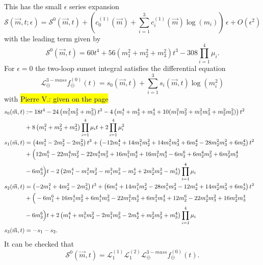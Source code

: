 \documentclass[a4paper,12pt]{article}
\numberwithin{equation}{section}
\numberwithin{figure}{subsection}
\theoremstyle{plain}
\theoremstyle{plain}
\theoremstyle{definition}
\theoremstyle{plain}
\theoremstyle{remark}
\theoremstyle{plain}
\def\su{\circleddash}
\newcommand{\pvnote}[1]{\sethlcolor{bubblegum} \protect\hl{Pierre V.: #1} \sethlcolor{yellow}}
\begin{document}
This has the small $\epsilon$ series expansion
\begin{equation}
    \mathscr{S}(\vec m,t;\epsilon)=\mathscr{S}^0(\vec m,t)
    +\left(c^{(1)}_0(\vec m)+
    \sum_{i=1}^3  c^{(1)}_i(\vec m)\log(m_i)\right)\,  \epsilon+O(\epsilon^2)
\end{equation}
with  the leading term given by
   \begin{equation}
   \mathscr{S}^0(\vec m,t)=60 t^{4}+56\left( m_{1}^{2}+ m_{2}^{2}+
     m_{3}^{2}\right) t^{3}
   -308 \prod_{i=1}^4 \mu_i.
 \end{equation}
For $\epsilon=0$ the two-loop sunset integral satisfies  the
differential equation
\begin{equation}
  \mathscr{L}^{3-mass}_\su f_\su^{(0)}(t)= s_0(\vec m,t)+ \sum_{i=1}^3
  s_i(\vec m,t)\log(m_i^2)  
\end{equation}
with \pvnote{given on the page}
\begin{align}
  s_0(\vec m,t)&:=18 t^{4}-24\left(m_{1}^{2}m_{2}^{2}+
       m_{3}^{2}\right) t^{3}-4\left( m_{1}^{4}+m_2^4+m_3^4+10(
       m_{1}^{2} m_{2}^{2}+ m_{1}^{2}
       m_{3}^{2}+m_{2}^{2}
       m_{3}^{2})\right) t^{2}\cr
       &+8
       \left(m_{1}^{2}+m_{2}^{2}+m_{3}^{2}\right)\prod_{i=1}^4\mu_i
       t +2 \prod_{i=1}^4\mu_i^2 \cr
  s_1(\vec m,t)&=\left(4 m_{1}^{2}-2 m_{2}^{2}-2 m_{3}^{2}\right)
       t^{3}+\left(-12 m_{1}^{4}+14 m_{1}^{2} m_{2}^{2}+14 m_{1}^{2}
       m_{3}^{2}+6 m_{2}^{4}-28 m_{2}^{2} m_{3}^{2}+6 m_{3}^{4}\right)
       t^{2}\cr
       &+\Big(12 m_{1}^{6}-22 m_{1}^{4} m_{2}^{2}-22 m_{1}^{4} m_{3}^{2}+16 m_{1}^{2} m_{2}^{4}+16 m_{1}^{2} m_{3}^{4}-6 m_{2}^{6}+6 m_{2}^{4} m_{3}^{2}+6 m_{2}^{2} m_{3}^{4}\cr&-6 m_{3}^{6}\Big) t-2 \left(2 m_{1}^{4}-m_{1}^{2} m_{2}^{2}-m_{1}^{2} m_{3}^{2}-m_{2}^{4}+2 m_{2}^{2} m_{3}^{2}-m_{3}^{4}\right) \prod_{i=1}^4\mu_i\cr
       s_2(\vec m,t)&=\left(-2 m_{1}^{2}+4 m_{2}^{2}-2 m_{3}^{2}\right)
            t^{3}+\left(6 m_{1}^{4}+14 m_{1}^{2} m_{2}^{2}-28
            m_{1}^{2} m_{3}^{2}-12 m_{2}^{4}+14 m_{2}^{2} m_{3}^{2}+6
            m_{3}^{4}\right) t^{2}\cr
            &+\Big(-6 m_{1}^{6}+16 m_{1}^{4} m_{2}^{2}+6 m_{1}^{4} m_{3}^{2}-22 m_{1}^{2} m_{2}^{4}+6 m_{1}^{2} m_{3}^{4}+12 m_{2}^{6}-22 m_{2}^{4} m_{3}^{2}+16 m_{2}^{2} m_{3}^{4}\cr&-6 m_{3}^{6}\Big) t +2 \left(m_{1}^{4}+m_{1}^{2} m_{2}^{2}-2 m_{1}^{2} m_{3}^{2}-2 m_{2}^{4}+m_{2}^{2} m_{3}^{2}+m_{3}^{4}\right) \prod_{i=1}^4\mu_i
\cr
            s_3(\vec m,t)&=-s_1-s_2.
\end{align}
It can be checked that 
\begin{equation}
  \mathscr{S}^0(\vec m,t)=   \mathscr{L}^{(1)}_1
     \mathscr{L}^{(2)}_1    \mathscr{L}^{3-mass}_\su  f_\su^{(0)}(t).
\end{equation}
\end{document}

